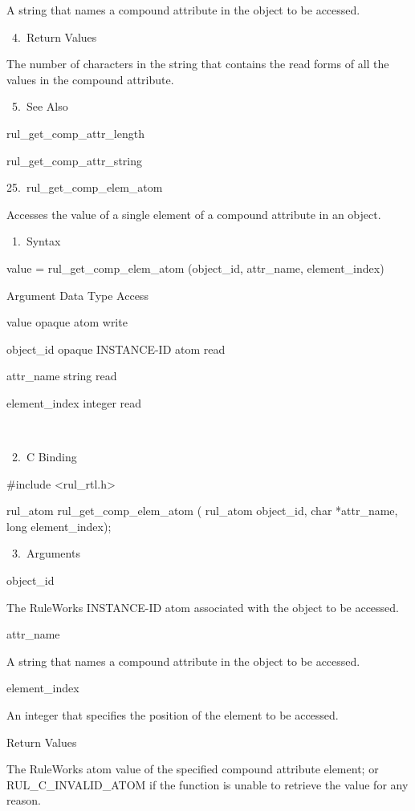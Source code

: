           A string that names a compound
          attribute in the object to be
          accessed.

       4. Return Values

          The number of characters in the
          string that contains the read forms
          of all the values in the compound
          attribute.

       5. See Also

    rul_get_comp_attr_length

    rul_get_comp_attr_string

25. rul_get_comp_elem_atom

    Accesses the value of a single element of
    a compound attribute in an object.

       1. Syntax

          value = rul_get_comp_elem_atom
          (object_id, attr_name,
          element_index)

          Argument  Data Type     Access

          value  opaque atom    write

          object_id  opaque INSTANCE-ID atom
           read

          attr_name  string     read

          element_index  integer     read

           

       2. C Binding

          #include <rul_rtl.h>

          rul_atom rul_get_comp_elem_atom (
          rul_atom object_id,
          char *attr_name,
          long element_index);

       3. Arguments

          object_id

          The RuleWorks INSTANCE-ID atom
          associated with the object to be
          accessed.

          attr_name

          A string that names a compound
          attribute in the object to be
          accessed.

          element_index

          An integer that specifies the
          position of the element to be
          accessed.

          Return Values

          The RuleWorks atom value of the
          specified compound attribute
          element; or RUL_C_INVALID_ATOM if
          the function is unable to retrieve
          the value for any reason.

